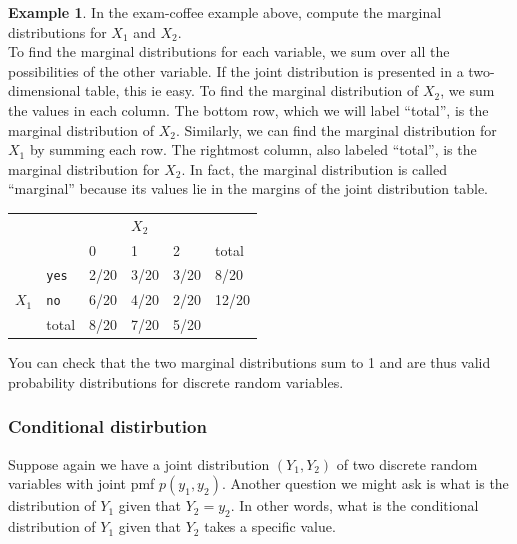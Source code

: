\documentclass[12pt]{article}
\theoremstyle{definition}
\newtheorem*{example}{Example}
\theoremstyle{remark}
\begin{document}
\begin{example}In the exam-coffee example above, compute the marginal distributions for $X_1$ and $X_2$.\\

To find the marginal distributions for each variable, we sum over all the possibilities of the other variable. If the joint distribution is presented in a two-dimensional table, this ie easy. To find the marginal distribution of $X_2$, we sum the values in each column. The bottom row, which we will label ``total'', is the marginal distribution of $X_2$. Similarly, we can find the marginal distribution for $X_1$ by summing each row. The rightmost column, also labeled ``total'', is the marginal distribution for $X_2$. In fact, the marginal distribution is called ``marginal'' because its values lie in the margins of the joint distribution table.

\begin{table}[H]
\centering
\begin{tabular}{llllll}
                       &                                 &      & $X_2$   &                           &       \\ \cline{3-5}
                       &                                 & 0    & 1    & 2                         & total \\ \cline{3-5}
\multicolumn{1}{l|}{}  & \multicolumn{1}{l|}{\texttt{yes}}    & 2/20 & 3/20 & \multicolumn{1}{l|}{3/20} & 8/20  \\
\multicolumn{1}{l|}{$X_1$} & \multicolumn{1}{l|}{\texttt{no}} & 6/20 & 4/20 & \multicolumn{1}{l|}{2/20} & 12/20 \\ \cline{3-5}
                       & total                           & 8/20 & 7/20 & 5/20                      &      
\end{tabular}
\end{table}
You can check that the two marginal distributions sum to 1 and are thus valid probability distributions for discrete random variables.

\end{example}

\subsubsection{Conditional distirbution}
Suppose again we have a joint distribution $(Y_1, Y_2)$ of two discrete random variables with joint pmf $p(y_1, y_2)$. Another question we might ask is what is the distribution of $Y_1$ given that $Y_2 = y_2$. In other words, what is the conditional distribution of $Y_1$ given that $Y_2$ takes a specific value.\\
\end{document}
